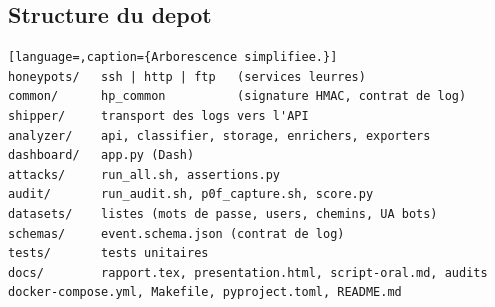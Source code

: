 \documentclass[11pt,a4paper]{article}
\begin{document}
\subsection{Structure du depot}
\begin{lstlisting}[language=,caption={Arborescence simplifiee.}]
honeypots/   ssh | http | ftp   (services leurres)
common/      hp_common          (signature HMAC, contrat de log)
shipper/     transport des logs vers l'API
analyzer/    api, classifier, storage, enrichers, exporters
dashboard/   app.py (Dash)
attacks/     run_all.sh, assertions.py
audit/       run_audit.sh, p0f_capture.sh, score.py
datasets/    listes (mots de passe, users, chemins, UA bots)
schemas/     event.schema.json (contrat de log)
tests/       tests unitaires
docs/        rapport.tex, presentation.html, script-oral.md, audits
docker-compose.yml, Makefile, pyproject.toml, README.md
\end{lstlisting}
\end{document}
